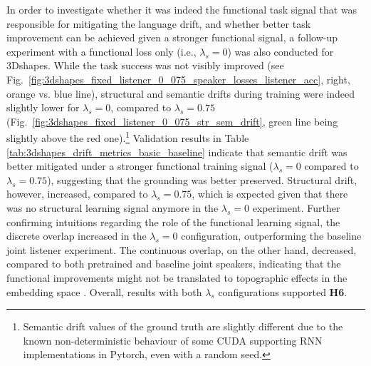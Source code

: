 In order to investigate whether it was indeed the functional task signal that was responsible for mitigating the language drift, and whether better task improvement can be achieved given a stronger functional signal, a follow-up experiment with a functional loss only (i.e., $\lambda_s=0$) was also conducted for 3Dshapes. While the task success was not visibly improved (see Fig.~\ref{fig:3dshapes_fixed_listener_0_075_speaker_losses_listener_acc}, right, orange vs. blue line), structural and semantic drifts during training were indeed slightly lower for $\lambda_s=0$, compared to $\lambda_s=0.75$ (Fig.~\ref{fig:3dshapes_fixed_listener_0_075_str_sem_drift}, green line being slightly above the red one).\footnote{Semantic drift values of the ground truth are slightly different due to the known non-deterministic behaviour of some CUDA supporting RNN implementations in Pytorch, even with a random seed.} Validation results in Table \ref{tab:3dshapes_drift_metrics_basic_baseline} indicate that semantic drift was better mitigated under a stronger functional training signal ($\lambda_s =0$ compared to $\lambda_s =0.75$), suggesting that the grounding was better preserved. Structural drift, however, increased, compared to $\lambda_s =0.75$, which is expected given that there was no structural learning signal anymore in the $\lambda_s =0$ experiment. Further confirming intuitions regarding the role of the functional learning signal, the discrete overlap increased in the $\lambda_s =0$ configuration, outperforming the baseline joint listener experiment. The continuous overlap, on the other hand, decreased, compared to both pretrained and baseline joint speakers, indicating that the functional improvements might not be translated to topographic effects in the embedding space \parencite[cf.][]{lazaridou2018emergence}. Overall, results with both $\lambda_s$ configurations supported \textbf{H6}.

